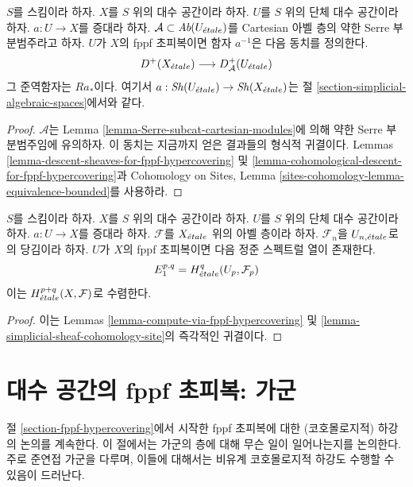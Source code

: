 \begin{lemma}
\label{lemma-fppf-hypercovering-equivalence-bounded}
$S$를 스킴이라 하자. $X$를 $S$ 위의 대수 공간이라 하자.
$U$를 $S$ 위의 단체 대수 공간이라 하자. $a : U \to X$를
증대라 하자.
$\mathcal{A} \subset \textit{Ab}(U_{\acute{e}tale})$를 Cartesian 아벨 층의
약한 Serre 부분범주라고 하자.
$U$가 $X$의 fppf 초피복이면 함자 $a^{-1}$은 다음 동치를 정의한다.
$$
D^+(X_{\acute{e}tale}) \longrightarrow D_\mathcal{A}^+(U_{\acute{e}tale})
$$
그 준역함자는 $Ra_*$이다. 여기서
$a : \mathop{\mathit{Sh}}\nolimits(U_{\acute{e}tale}) \to \mathop{\mathit{Sh}}\nolimits(X_{\acute{e}tale})$는 절
\ref{section-simplicial-algebraic-spaces}에서와 같다.
\end{lemma}

\begin{proof}
$\mathcal{A}$는
Lemma \ref{lemma-Serre-subcat-cartesian-modules}에 의해
약한 Serre 부분범주임에 유의하자.
이 동치는 지금까지 얻은 결과들의 형식적 귀결이다.
Lemmas \ref{lemma-descent-sheaves-for-fppf-hypercovering} 및
\ref{lemma-cohomological-descent-for-fppf-hypercovering}과
Cohomology on Sites, Lemma
\ref{sites-cohomology-lemma-equivalence-bounded}를 사용하라.
\end{proof}

\begin{lemma}
\label{lemma-spectral-sequence-fppf-hypercovering}
$S$를 스킴이라 하자. $X$를 $S$ 위의 대수 공간이라 하자.
$U$를 $S$ 위의 단체 대수 공간이라 하자. $a : U \to X$를
증대라 하자. $\mathcal{F}$를 $X_{\acute{e}tale}$ 위의 아벨 층이라 하자.
$\mathcal{F}_n$을 $U_{n, {\acute{e}tale}}$로의 당김이라 하자.
$U$가 $X$의 fppf 초피복이면 다음 정준 스펙트럴 열이 존재한다.
$$
E_1^{p, q} = H^q_{\acute{e}tale}(U_p, \mathcal{F}_p)
$$
이는 $H^{p + q}_{\acute{e}tale}(X, \mathcal{F})$로 수렴한다.
\end{lemma}

\begin{proof}
이는 Lemmas \ref{lemma-compute-via-fppf-hypercovering} 및
\ref{lemma-simplicial-sheaf-cohomology-site}의 즉각적인 귀결이다.
\end{proof}

\section{대수 공간의 fppf 초피복: 가군}
\label{section-fppf-hypercovering-modules}

\noindent
절 \ref{section-fppf-hypercovering}에서 시작한 fppf 초피복에 대한
(코호몰로지적) 하강의 논의를 계속한다. 이 절에서는 가군의 층에 대해
무슨 일이 일어나는지를 논의한다. 주로 준연접 가군을 다루며, 이들에
대해서는 비유계 코호몰로지적 하강도 수행할 수 있음이 드러난다.


